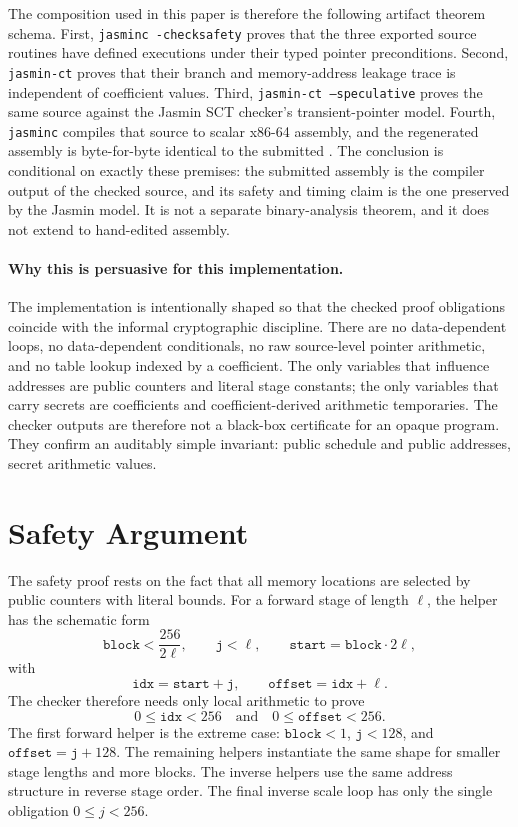 \documentclass[10pt,twocolumn]{article}
\newcommand{\jasmin}{Jasmin}
\begin{document}
The composition used in this paper is therefore the following artifact theorem
schema.  First, \texttt{jasminc -checksafety} proves that the three exported
source routines have defined executions under their typed pointer preconditions.
Second, \texttt{jasmin-ct} proves that their branch and memory-address leakage
trace is independent of coefficient values.  Third,
\texttt{jasmin-ct --speculative} proves the same source against the
\jasmin{} SCT checker's transient-pointer model.  Fourth, \texttt{jasminc}
compiles that source to scalar x86-64 assembly, and the regenerated assembly is
byte-for-byte identical to the submitted .  The conclusion is
conditional on exactly these premises: the submitted assembly is the compiler
output of the checked source, and its safety and timing claim is the one
preserved by the \jasmin{} model.  It is not a separate binary-analysis theorem,
and it does not extend to hand-edited assembly.

\paragraph{Why this is persuasive for this implementation.}
The implementation is intentionally shaped so that the checked proof
obligations coincide with the informal cryptographic discipline.  There are no
data-dependent loops, no data-dependent conditionals, no raw source-level
pointer arithmetic, and no table lookup indexed by a coefficient.  The only
variables that influence addresses are public counters and literal stage
constants; the only variables that carry secrets are coefficients and
coefficient-derived arithmetic temporaries.  The checker outputs are therefore
not a black-box certificate for an opaque program.  They confirm an auditably
simple invariant: public schedule and public addresses, secret arithmetic
values.

\section{Safety Argument}

The safety proof rests on the fact that all memory locations are selected by
public counters with literal bounds.  For a forward stage of length \(\ell\),
the helper has the schematic form
\[
  \texttt{block}<\frac{256}{2\ell},\qquad
  \texttt{j}<\ell,\qquad
  \texttt{start}=\texttt{block}\cdot 2\ell,
\]
with
\[
  \texttt{idx}=\texttt{start}+\texttt{j},\qquad
  \texttt{offset}=\texttt{idx}+\ell.
\]
The checker therefore needs only local arithmetic to prove
\[
  0 \leq \texttt{idx}<256
  \quad\text{and}\quad
  0 \leq \texttt{offset}<256.
\]
The first forward helper is the extreme case: \(\texttt{block}<1\),
\(\texttt{j}<128\), and \(\texttt{offset}=\texttt{j}+128\).  The remaining
helpers instantiate the same shape for smaller stage lengths and more blocks.
The inverse helpers use the same address structure in reverse stage order.  The
final inverse scale loop has only the single obligation \(0\leq j<256\).
\end{document}
